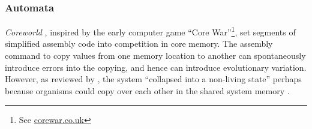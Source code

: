 %
%
%
%
%
%
%
%
%
%
\subsubsection{Automata}

\emph{Coreworld} \parencite{Rasmussen1990}, inspired by the early computer game ``Core War''\footnote{See \url{corewar.co.uk}}, set segments of simplified assembly code into competition in core memory. The assembly command to copy values from one memory location to another can spontaneously introduce errors into the copying, and hence can introduce evolutionary variation. However, as reviewed by \textcite{Ofria2004}, the system ``collapsed into a non-living state'' perhaps because organisms could copy over each other in the shared system memory \parencite{Ofria2004}.

